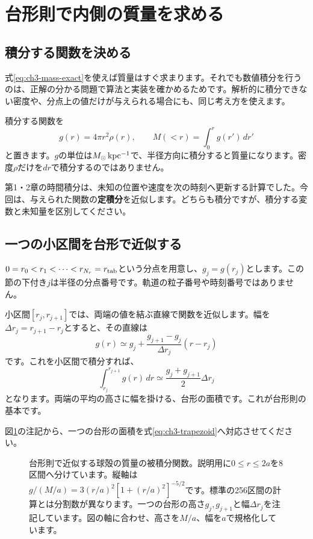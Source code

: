 \section{台形則で内側の質量を求める}
\label{sec:ch3-trapezoid}
\subsection{積分する関数を決める}
式\eqref{eq:ch3-mass-exact}を使えば質量はすぐ求まります。それでも数値積分を行うのは、正解の分かる問題で算法と実装を確かめるためです。解析的に積分できない密度や、分点上の値だけが与えられる場合にも、同じ考え方を使えます。

積分する関数を
\begin{equation}
 g(r)=4\pi r^2\rho(r),\qquad M(<r)=\int_0^r g(r')\,dr'
 \label{eq:ch3-integrand}
\end{equation}
と置きます。$g$の単位は$M_\odot\,\mathrm{kpc^{-1}}$で、半径方向に積分すると質量になります。密度$\rho$だけを$dr$で積分するのではありません。

第1・2章の時間積分は、未知の位置や速度を次の時刻へ更新する計算でした。今回は、与えられた関数の\textbf{定積分}を近似します。どちらも積分ですが、積分する変数と未知量を区別してください。

\subsection{一つの小区間を台形で近似する}
$0=r_0<r_1<\cdots<r_{N_r}=r_{\rm tab}$という分点を用意し、$g_j=g(r_j)$とします。この節の下付き$j$は半径の分点番号です。軌道の粒子番号や時刻番号ではありません。

小区間$[r_j,r_{j+1}]$では、両端の値を結ぶ直線で関数を近似します。幅を$\Delta r_j=r_{j+1}-r_j$とすると、その直線は
\[
 g(r)\simeq g_j+\frac{g_{j+1}-g_j}{\Delta r_j}(r-r_j)
\]
です。これを小区間で積分すれば、
\begin{equation}
 \int_{r_j}^{r_{j+1}}g(r)\,dr
 \simeq \frac{g_j+g_{j+1}}{2}\Delta r_j
 \label{eq:ch3-trapezoid}
\end{equation}
となります。両端の平均の高さに幅を掛ける、台形の面積です。これが台形則の基本です。\cite{sugiura2009}

図\ref{fig:ch3-trapezoid}の注記から、一つの台形の面積を式\eqref{eq:ch3-trapezoid}へ対応させてください。

\begin{figure}[htbp]
\centering
\caption{台形則で近似する球殻の質量の被積分関数。説明用に$0\leq r\leq2a$を8区間へ分けています。縦軸は$g/(M/a)=3(r/a)^2[1+(r/a)^2]^{-5/2}$です。標準の256区間の計算とは分割数が異なります。一つの台形の高さ$g_j,g_{j+1}$と幅$\Delta r_j$を注記しています。図の軸に合わせ、高さを$M/a$、幅を$a$で規格化しています。}
\label{fig:ch3-trapezoid}
\end{figure}

